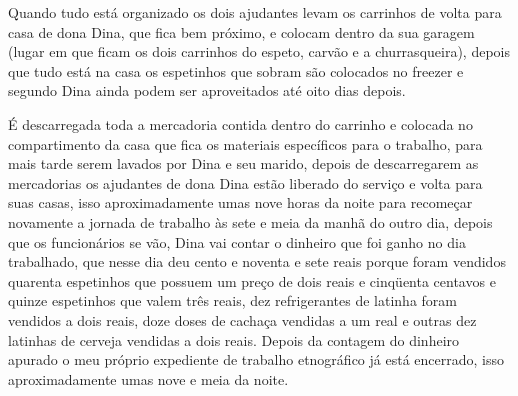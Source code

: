Quando tudo está organizado os dois ajudantes levam os carrinhos de volta para casa de dona Dina, que fica bem próximo, e colocam dentro da sua garagem (lugar em que ficam os dois carrinhos do espeto, carvão e a churrasqueira), depois que tudo está na casa os espetinhos que sobram são colocados no freezer e segundo Dina ainda podem ser aproveitados até oito dias depois. 

É descarregada toda a mercadoria contida dentro do carrinho e colocada no compartimento da casa que fica os materiais específicos para o trabalho, para mais tarde serem lavados por Dina e seu marido, depois de descarregarem as mercadorias os ajudantes de dona Dina estão liberado do serviço e volta para suas casas, isso aproximadamente umas nove horas da noite para recomeçar novamente a jornada de trabalho às sete e meia da manhã do outro dia, depois que os funcionários se vão, Dina vai contar o dinheiro que foi ganho no dia trabalhado, que nesse dia deu cento e noventa e sete reais porque foram vendidos quarenta espetinhos que possuem um preço de dois reais e cinqüenta centavos e quinze espetinhos que valem três reais, dez refrigerantes de latinha foram vendidos a dois reais, doze doses de cachaça vendidas a um real e outras dez latinhas de cerveja vendidas a dois reais. Depois da contagem do dinheiro apurado o meu próprio expediente de trabalho etnográfico já está encerrado, isso aproximadamente umas nove e meia da noite.
